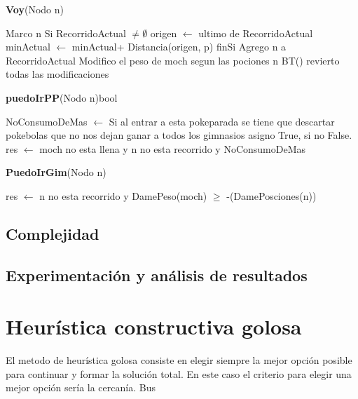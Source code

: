 \documentclass[spanish,12pt]{article}
\begin{document}
\begin{algorithm}[H]{\textbf{Voy}(Nodo n)}
	\begin{algorithmic}[1]
		\State Marco n
		\State Si RecorridoActual $ \not= \emptyset$
		\State \quad origen $\gets$ ultimo de RecorridoActual
		\State \quad minActual $\gets$ minActual+ Distancia(origen, p)
		\State finSi
		\State Agrego n a RecorridoActual
		\State Modifico el peso de moch segun las pociones n
		\State BT()
		\State revierto todas las modificaciones
	\end{algorithmic}
\end{algorithm}

\begin{algorithm}[H]{\textbf{puedoIrPP}(Nodo n){bool}}
	\begin{algorithmic}[1]
	\State NoConsumoDeMas $\gets$ Si al entrar a esta pokeparada se tiene que descartar pokebolas que no nos dejan ganar a todos los gimnasios asigno True, si no False.
	\State  res $\gets$  moch no esta llena y n no esta recorrido y NoConsumoDeMas
	\end{algorithmic}
\end{algorithm}

\begin{algorithm}[H]{\textbf{PuedoIrGim}(Nodo n)}
	\begin{algorithmic}[1]
		\state res $\gets$  n no esta recorrido y DamePeso(moch) $\geq$ -(DamePosciones(n))
	\end{algorithmic}
\end{algorithm}


\subsection{Complejidad}

\subsection{Experimentación y análisis de resultados}



\section{Heurística constructiva golosa}

El metodo de heurística golosa consiste en elegir siempre la mejor opción posible para continuar y formar la solución total. En este caso el criterio para elegir una mejor opción sería la cercanía. Bus
\end{document}
